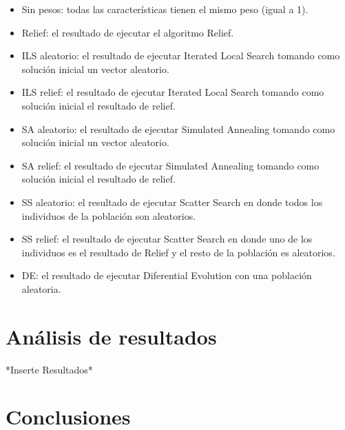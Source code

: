 \documentclass{ci5652}
\begin{document}
\begin{itemize}
  \item Sin pesos: todas las características tienen el mismo peso (igual a 1).
  \item Relief: el resultado de ejecutar el algoritmo Relief.
  \item ILS aleatorio: el resultado de ejecutar Iterated Local Search tomando
  como solución inicial un vector aleatorio.
  \item ILS relief: el resultado de ejecutar Iterated Local Search tomando como
  solución inicial el resultado de relief.
  \item SA aleatorio: el resultado de ejecutar Simulated Annealing tomando como
  solución inicial un vector aleatorio.
  \item SA relief: el resultado de ejecutar Simulated Annealing tomando como
  solución inicial el resultado de relief.
  \item SS aleatorio: el resultado de ejecutar Scatter Search en donde todos los
  individuos de la población son aleatorios.
  \item SS relief: el resultado de ejecutar Scatter Search en donde uno de los
  individuos es el resultado de Relief y el resto de la población es aleatorios.
  \item DE: el resultado de ejecutar Diferential Evolution con una población
  aleatoria.
\end{itemize}


\section{Análisis de resultados}
*Inserte Resultados*\\

\section*{Conclusiones}

\end{document}
